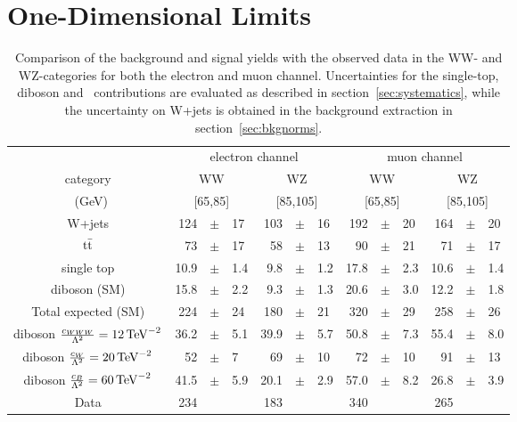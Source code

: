 \section{One-Dimensional Limits}
\begin{table}
	\centering
	\caption[Comparison of the background and signal yields with the observed data in the WW- and WZ-categories]{Comparison of the background and signal yields with the observed data in the WW- and WZ-categories for both the electron and muon channel. Uncertainties for the single-top, diboson and \ttbar \ contributions are evaluated as described in section~\ref{sec:systematics}, while the uncertainty on W+jets is obtained in the background extraction in section~\ref{sec:bkgnorms}.}
	\label{tab:limits:bkgnorms}
	\begin{tabular}{cr@{\,}c@{\,}lr@{\,}c@{\,}lr@{\,}c@{\,}lr@{\,}c@{\,}l}
		\hline
		& \multicolumn{6}{c}{electron channel} & \multicolumn{6}{c}{muon channel} \\
		category  & \multicolumn{3}{c}{WW} & \multicolumn{3}{c}{WZ} &\multicolumn{3}{c}{WW} & \multicolumn{3}{c}{WZ} \\
		\Mpr ~(GeV)& \multicolumn{3}{c}{[65,85]} & \multicolumn{3}{c}{[85,105]} &\multicolumn{3}{c}{[65,85]} & \multicolumn{3}{c}{[85,105]} \\
		\hline
		W+jets     		   & 124  &$\pm$& 17   & 103 &$\pm$& 16   & 192  &$\pm$& 20   & 164  &$\pm$& 20  \\ 
		$\mathrm{t}\bar{\mathrm{t}}$            & 73   &$\pm$& 17   & 58  &$\pm$& 13   & 90   &$\pm$& 21   & 71   &$\pm$& 17 \\
		single top 		   & 10.9 &$\pm$& 1.4  & 9.8 &$\pm$& 1.2  & 17.8 &$\pm$& 2.3  & 10.6 &$\pm$& 1.4  \\
        diboson  (SM) 	   & 15.8 &$\pm$& 2.2  & 9.3 &$\pm$& 1.3  & 20.6 &$\pm$& 3.0  & 12.2 &$\pm$& 1.8 \\
        Total expected (SM) & 224  &$\pm$& 24   & 180 &$\pm$& 21   & 320  &$\pm$& 29   & 258  &$\pm$& 26 \\
        \hline
        diboson $\frac{c_{WWW}}{\Lambda^2}=12\, {\rm TeV}^{-2}$ & 36.2 & $\pm$& 5.1 & 39.9 &$\pm$& 5.7 & 50.8 &$\pm$& 7.3 & 55.4 &$\pm$& 8.0 \\
		diboson $\frac{c_{W}}{\Lambda^2}=20\, {\rm TeV}^{-2}$   & 52   & $\pm$& 7   & 69   &$\pm$& 10  & 72   &$\pm$& 10  & 91   &$\pm$& 13 \\
		diboson $\frac{c_{B}}{\Lambda^2}=60\, {\rm TeV}^{-2}$   & 41.5 & $\pm$& 5.9 & 20.1 &$\pm$& 2.9 & 57.0 &$\pm$& 8.2 & 26.8 &$\pm$& 3.9 \\
		\hline
        Data   & 234 & & & 183 & & & 340 & & & 265 & &\\
        \hline
	\end{tabular}
\end{table}

